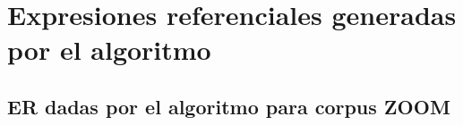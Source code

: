 \chapter{Expresiones referenciales generadas por el algoritmo}

\section{ER dadas por el algoritmo para corpus ZOOM}
\label{er-mapa-zoom}













